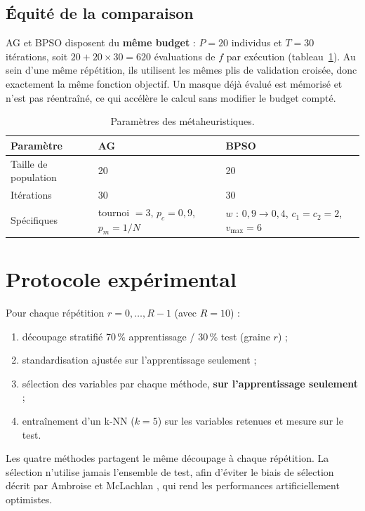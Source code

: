 \documentclass[11pt,a4paper]{report}
\begin{document}
\subsection{Équité de la comparaison}
AG et BPSO disposent du \textbf{même budget} : $P = 20$ individus et $T = 30$ itérations, soit
$20 + 20 \times 30 = 620$ évaluations de $f$ par exécution (tableau~\ref{tab:params}). Au sein
d'une même répétition, ils utilisent les mêmes plis de validation croisée, donc exactement la même
fonction objectif. Un masque déjà évalué est mémorisé et n'est pas réentraîné, ce qui accélère le
calcul sans modifier le budget compté.

\begin{table}[H]
\centering
\caption{Paramètres des métaheuristiques.}
\label{tab:params}
\begin{tabular}{@{}lll@{}}
\toprule
Paramètre & AG & BPSO \\
\midrule
Taille de population & 20 & 20 \\
Itérations & 30 & 30 \\
Spécifiques & tournoi $= 3$, $p_c = 0{,}9$, $p_m = 1/N$ & $w$ : $0{,}9 \to 0{,}4$, $c_1 = c_2 = 2$, $v_{\max} = 6$ \\
\bottomrule
\end{tabular}
\end{table}

\section{Protocole expérimental}
Pour chaque répétition $r = 0, \dots, R-1$ (avec $R = 10$) :
\begin{enumerate}
  \item découpage stratifié 70\,\% apprentissage / 30\,\% test (graine $r$) ;
  \item standardisation ajustée sur l'apprentissage seulement ;
  \item sélection des variables par chaque méthode, \textbf{sur l'apprentissage seulement} ;
  \item entraînement d'un k-NN ($k = 5$) sur les variables retenues et mesure sur le test.
\end{enumerate}
Les quatre méthodes partagent le même découpage à chaque répétition. La sélection n'utilise
jamais l'ensemble de test, afin d'éviter le biais de sélection décrit par Ambroise et McLachlan
\cite{ambroise2002}, qui rend les performances artificiellement optimistes.
\end{document}
